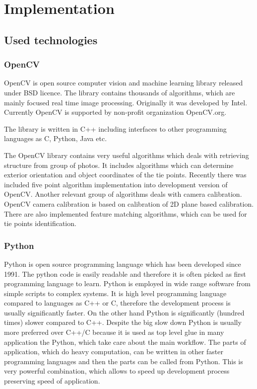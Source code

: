 \documentclass[a4paper,12pt]{article}
\begin{document}
\section{Implementation}

\subsection{Used technologies}

\subsubsection{OpenCV}

OpenCV is open source computer vision and machine learning library released under BSD licence.
The library contains thousands of algorithms, which are mainly focused real time image processing.
Originally it was developed by Intel. Currently OpenCV is supported by non-profit organization OpenCV.org.

The library is written in C++ including interfaces to other programming languages as C, Python, Java etc. 

The OpenCV library contains very useful algorithms which deals with retrieving structure from group 
of photos. It includes algorithms which can determine exterior orientation 
and object coordinates of the tie points.
Recently there was included five point algorithm implementation into development version of OpenCV.
Another relevant group of algorithms deals with camera calibration. OpenCV  camera calibration
is based on calibration of 2D plane based calibration.  
There are also implemented feature matching algorithms, which can be used for tie points identification. 


\subsubsection{Python}

Python is open source programming language which has been developed since 1991. 
The python code is easily readable and therefore it is often picked as first programming
language to learn. Python is employed in wide range software from simple scripts to complex systems.
It is high level programming language compared to languages as C++ or C, therefore 
the development process is usually significantly faster. On the other hand 
Python is significantly (hundred times) slower compared to C++. Despite the big 
slow down Python is usually more preferred over C++/C because 
it is used as top level glue in many application the Python, which take care about 
the main workflow. The parts of application, which do heavy computation, can 
be written in other faster programming languages and then the parts can be called 
from Python. This is very powerful combination, which allows to speed up development 
process preserving speed of application.
\end{document}
